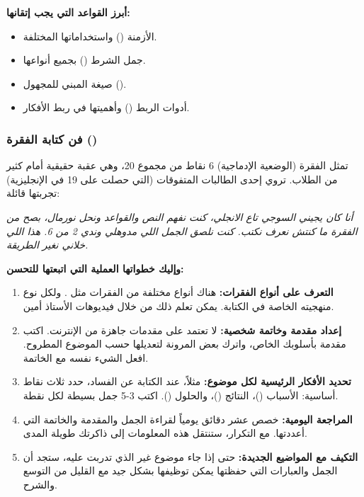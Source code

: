 \documentclass[12pt,a4paper]{book}
\newcommand{\quoteAr}[1]{%
	\begin{myquote}
		\itshape #1
	\end{myquote}
}
\begin{document}
	\textbf{أبرز القواعد التي يجب إتقانها:}
	\begin{itemize}
		\item الأزمنة () واستخداماتها المختلفة.
		\item جمل الشرط () بجميع أنواعها.
		\item صيغة المبني للمجهول ().
		\item أدوات الربط () وأهميتها في ربط الأفكار.
	\end{itemize}
	
	\subsubsection{فن كتابة الفقرة ()}
		\label{sec:english-paragraph-post}
	
	تمثل الفقرة (الوضعية الإدماجية) 6 نقاط من مجموع 20، وهي عقبة حقيقية أمام كثير من الطلاب. تروي إحدى الطالبات المتفوقات (التي حصلت على 19 في الإنجليزية) تجربتها قائلة:
	
	\quoteAr{أنا كان يجيني السوجي تاع الانجلي، كنت نفهم النص والقواعد ونحل نورمال، بصح من الفقرة ما كنتش نعرف نكتب. كنت نلصق الجمل اللي مدوهلي وندي 2 من 6. هذا اللي خلاني نغير الطريقة.}
	
	\textbf{وإليك خطواتها العملية التي اتبعتها للتحسن:}
	
	\begin{enumerate}
		\item \textbf{التعرف على أنواع الفقرات:} هناك أنواع مختلفة من الفقرات مثل . ولكل نوع منهجيته الخاصة في الكتابة. يمكن تعلم ذلك من خلال فيديوهات الأستاذ أمين.
		\item \textbf{إعداد مقدمة وخاتمة شخصية:} لا تعتمد على مقدمات جاهزة من الإنترنت. اكتب مقدمة بأسلوبك الخاص، واترك بعض المرونة لتعديلها حسب الموضوع المطروح. افعل الشيء نفسه مع الخاتمة.
		\item \textbf{تحديد الأفكار الرئيسية لكل موضوع:} مثلاً، عند الكتابة عن الفساد، حدد ثلاث نقاط أساسية: الأسباب ()، النتائج ()، والحلول (). اكتب 3-5 جمل بسيطة لكل نقطة.
		\item \textbf{المراجعة اليومية:} خصص عشر دقائق يومياً لقراءة الجمل والمقدمة والخاتمة التي أعددتها. مع التكرار، ستنتقل هذه المعلومات إلى ذاكرتك طويلة المدى.
		\item \textbf{التكيف مع المواضيع الجديدة:} حتى إذا جاء موضوع غير الذي تدربت عليه، ستجد أن الجمل والعبارات التي حفظتها يمكن توظيفها بشكل جيد مع القليل من التوسع والشرح.
	\end{enumerate}
	
\end{document}
